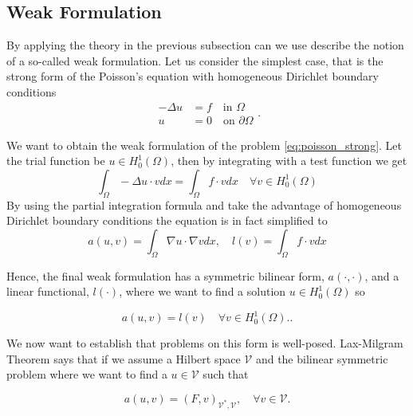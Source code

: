 \subsection{Weak Formulation}%
\label{sub:weak_formulation}

By applying the theory in the previous subsection can we use describe the notion of a so-called weak formulation. Let us consider the simplest case, that is the strong form of the Poisson's equation with homogeneous Dirichlet boundary conditions
\begin{equation}
\label{eq:poisson_strong}
\begin{split}
-\Delta u & = f \quad \text{in } \Omega \\
u & =0 \quad \text{on } \partial \Omega
\end{split}
.\end{equation}

We want to obtain the weak formulation of the problem \eqref{eq:poisson_strong}. Let the trial function be $u \in H_{0}^{1}\left( \Omega  \right) $, then by integrating with a test function we get \[
\int_{\Omega }^{} - \Delta u \cdot v dx = \int_{\Omega }^{} f \cdot v dx \quad \forall v \in H^{1}_{0}\left( \Omega  \right)
\]
By using the partial integration formula and take the advantage of homogeneous Dirichlet boundary conditions the equation is in fact simplified to \[
a\left( u,v \right) = \int_{\Omega }^{}  \nabla u\cdot \nabla v dx , \quad l\left( v \right)  = \int_{\Omega }^{}  f\cdot v dx
\]

Hence, the final weak formulation has a symmetric bilinear form, $a\left( \cdot ,\cdot  \right) $, and a linear functional, $l\left( \cdot  \right) $, where we want to find a solution $u \in H^{1}_{0}\left( \Omega  \right) $  so

\begin{equation}
\label{eq:poissons_weak_formulation}
a\left( u,v \right) = l\left( v \right) \quad \forall v \in H^{1}_{0}\left( \Omega  \right).
.\end{equation}

We now want to establish that problems on this form is well-posed.
Lax-Milgram Theorem says that if we assume a Hilbert space $\mathcal{V} $ and the bilinear symmetric problem where we want to find a $u \in \mathcal{V} $  such that

\begin{equation*}
    a\left( u,v \right)  = \left( F, v \right) _{\mathcal{V} ^{*}, \mathcal{V} }, \quad \forall v \in  \mathcal{V}
.\end{equation*}

